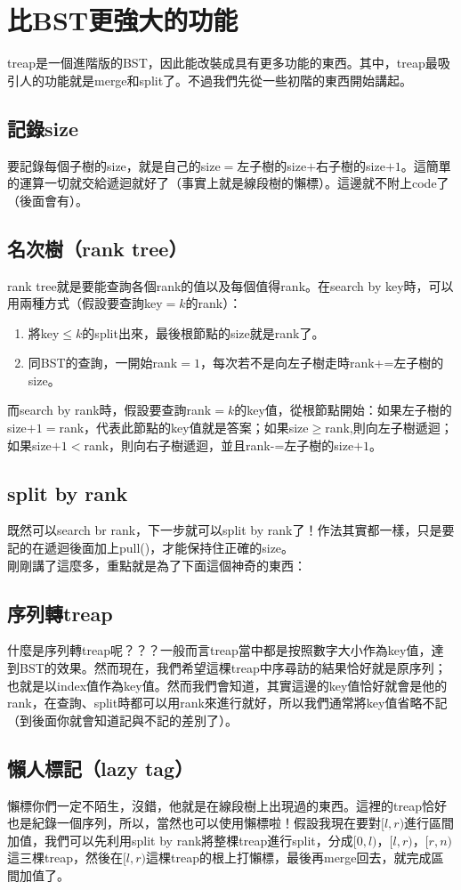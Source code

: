 \section{比BST更強大的功能}
treap是一個進階版的BST，因此能改裝成具有更多功能的東西。其中，treap最吸引人的功能就是merge和split了。不過我們先從一些初階的東西開始講起。
\subsection{記錄size}
要記錄每個子樹的size，就是自己的size$=$左子樹的size$+$右子樹的size$+1$。這簡單的運算一切就交給遞迴就好了（事實上就是線段樹的懶標）。這邊就不附上code了（後面會有）。
\subsection{名次樹（rank tree）}
rank tree就是要能查詢各個rank的值以及每個值得rank。在search by key時，可以用兩種方式（假設要查詢key$=k$的rank）：
\begin{enumerate}
\item 將key$\leq k$的split出來，最後根節點的size就是rank了。
\item 同BST的查詢，一開始rank$=1$，每次若不是向左子樹走時rank+=左子樹的size。
\end{enumerate}
而search by rank時，假設要查詢rank$=k$的key值，從根節點開始：如果左子樹的size$+1=$rank，代表此節點的key值就是答案；如果size$\geq $rank,則向左子樹遞迴；如果size$+1<$rank，則向右子樹遞迴，並且rank-=左子樹的size$+1$。
\subsection{split by rank}
既然可以search br rank，下一步就可以split by rank了！作法其實都一樣，只是要記的在遞迴後面加上pull()，才能保持住正確的size。\\

剛剛講了這麼多，重點就是為了下面這個神奇的東西：
\subsection{序列轉treap}
什麼是序列轉treap呢？？？一般而言treap當中都是按照數字大小作為key值，達到BST的效果。然而現在，我們希望這棵treap中序尋訪的結果恰好就是原序列；也就是以index值作為key值。然而我們會知道，其實這邊的key值恰好就會是他的rank，在查詢、split時都可以用rank來進行就好，所以我們通常將key值省略不記（到後面你就會知道記與不記的差別了）。
\subsection{懶人標記（lazy tag）}
懶標你們一定不陌生，沒錯，他就是在線段樹上出現過的東西。這裡的treap恰好也是紀錄一個序列，所以，當然也可以使用懶標啦！假設我現在要對$[l,r)$進行區間加值，我們可以先利用split by rank將整棵treap進行split，分成$[0,l)$，$[l,r)$，$[r,n)$這三棵treap，然後在$[l,r)$這棵treap的根上打懶標，最後再merge回去，就完成區間加值了。
